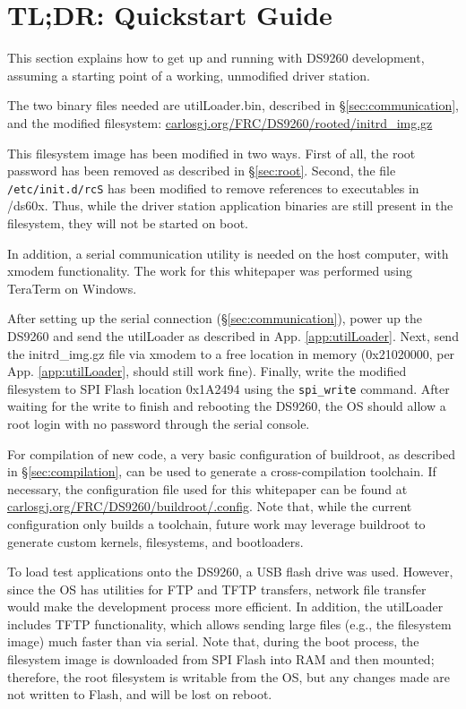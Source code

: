 \documentclass[]{article}
\begin{document}
\section{TL;DR: Quickstart Guide}
\label{sec:tldr}
\par This section explains how to get up and running with DS9260 development, assuming a starting point of a working, unmodified driver station.
\par The two binary files needed are utilLoader.bin, described in \S\ref{sec:communication}, and the modified filesystem: \href{http://carlosgj.org/FRC/DS9260/rooted/initrd_img.gz}{carlosgj.org/FRC/DS9260/rooted/initrd\_img.gz}
\par This filesystem image has been modified in two ways. First of all, the root password has been removed as described in \S\ref{sec:root}. Second, the file \texttt{/etc/init.d/rcS} has been modified to remove references to executables in /ds60x. Thus, while the driver station application binaries are still present in the filesystem, they will not be started on boot. 
\par In addition, a serial communication utility is needed on the host computer, with xmodem functionality. The work for this whitepaper was performed using TeraTerm on Windows. 
\par After setting up the serial connection (\S\ref{sec:communication}), power up the DS9260 and send the utilLoader as described in App. \ref{app:utilLoader}. Next, send the initrd\_img.gz file via xmodem to a free location in memory (0x21020000, per App. \ref{app:utilLoader}, should still work fine). Finally, write the modified filesystem to SPI Flash location 0x1A2494 using the \texttt{spi\_write} command. After waiting for the write to finish and rebooting the DS9260, the OS should allow a root login with no password through the serial console. 
\par For compilation of new code, a very basic configuration of buildroot, as described in \S\ref{sec:compilation}, can be used to generate a cross-compilation toolchain. If necessary, the configuration file used for this whitepaper can be found at \href{http://carlosgj.org/FRC/DS9260/buildroot/.config}{carlosgj.org/FRC/DS9260/buildroot/.config}. Note that, while the current configuration only builds a toolchain, future work may leverage buildroot to generate custom kernels, filesystems, and bootloaders.
\par To load test applications onto the DS9260, a USB flash drive was used. However, since the OS has utilities for FTP and TFTP transfers, network file transfer would make the development process more efficient. In addition, the utilLoader includes TFTP functionality, which allows sending large files (e.g., the filesystem image) much faster than via serial. Note that, during the boot process, the filesystem image is downloaded from SPI Flash into RAM and then mounted; therefore, the root filesystem is writable from the OS, but any changes made are not written to Flash, and will be lost on reboot. 
\end{document}
